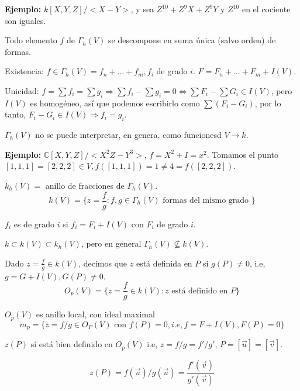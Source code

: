 \textbf{Ejemplo: } $k[X,Y,Z]/<X-Y>$, y sea $Z^{10}+Z^9X+Z^9Y$ y $Z^{10}$ en el cociente son iguales. 

\begin{Prop}
Todo elemento $f$ de $\Gamma_h(V)$ se descompone en suma única (salvo orden) de formas. 
\end{Prop}

\begin{Dem}
Existencia: $f\in \Gamma_h(V) = f_n+\dots + f_m, f_i$ de grado $i$. $F= F_n+\dots + F_m + I(V)$.

Unicidad: $f=\sum f_i = \sum g_i \Rightarrow \sum f_i - \sum g_i = 0 \Leftrightarrow \sum F_i - \sum G_i \in I(V)$, pero $I(V)$ es homogéneo, así que podemos escribirlo como $\sum (F_i- G_i)$, por lo tanto, $F_i-G_i \in I(V) \Rightarrow f_i=g_i$.
\end{Dem}

\begin{nota}
$\Gamma_h(V)$ no se puede interpretar, en genera, como funcionesd $V \rightarrow k$. 
\end{nota}

\textbf{Ejemplo: } $\mathbb{C}[X,Y,Z]/<X^2Z-Y^3>$, $f=X^2+I=x^2$. Tomamos el punto $[1,1,1]=[2,2,2]\in V, f([1,1,1])= 1 \neq 4 = f([2,2,2])$. 


\begin{Def}
$k_h(V)=$ anillo de fracciones de $\Gamma_h (V)$.
$$k(V) = \{ z = \frac{f}{g} : f,g \in \Gamma_h (V) \text{ formas del mismo grado } \} $$

$f_i$ es de grado $i$ si $f_i=F_i+I(V)$ con $F_i$ de grado $i$. 
\end{Def}

\begin{nota}

$k\subset k(V) \subset k_h(V)$, pero en general $\Gamma_h(V) \not \subseteq k(V)$.
\end{nota}

\begin{Def}
Dado $z=\frac{f}{g} \in k(V)$, decimos que $z$ está definida en $P$ si $g(P) \neq 0$, i.e, $g=G+I(V), G(P)\neq 0$.
$$O_p(V)=\{ z = \frac{f}{g}  \in k(V): z \text{ está definido en } P \} $$

$O_p(V)$ es anillo local, con ideal maximal
$$m_p= \{ z = f/g\in O_P(V) \text{ con } f(P)=0, i.e, f=F+I(V), F(P)=0\} $$
\end{Def}

\begin{nota}
$z(P)$ sí está bien definido en $O_p(V)$ i.e, $z=f/g = f'/g'$, $P=[\vec{u}]=[\vec{v}]$. 

$$z(P)=f(\vec{u})/g(\vec{u}) = \frac{f'(\vec{v})}{g'(\vec{v})} $$

\end{nota}

